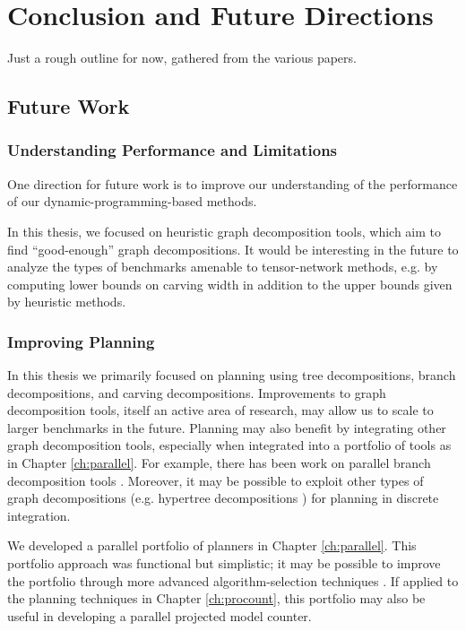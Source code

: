\chapter{Conclusion and Future Directions}
\label{ch:conclusion}
Just a rough outline for now, gathered from the various papers.

\section{Future Work}

\subsection{Understanding Performance and Limitations}
One direction for future work is to improve our understanding of the performance of our dynamic-programming-based methods.  

In this thesis, we focused on heuristic graph decomposition tools, which aim to find ``good-enough'' graph decompositions. It would be interesting in the future to analyze the types of benchmarks amenable to tensor-network methods, e.g. by computing lower bounds on carving width in addition to the upper bounds given by heuristic methods. 

\subsection{Improving Planning}
In this thesis we primarily focused on planning using tree decompositions, branch decompositions, and carving decompositions. 
Improvements to graph decomposition tools, itself an active area of research, may allow us to scale to larger benchmarks in the future.
Planning may also benefit by integrating other graph decomposition tools, especially when integrated into a portfolio of tools as in Chapter \ref{ch:parallel}. 
For example, there has been work on parallel branch decomposition tools \cite{hicks2000branch}.
Moreover, it may be possible to exploit other types of graph decompositions (e.g. hypertree decompositions \cite{AGG07}) for planning in discrete integration.

We developed a parallel portfolio of planners in Chapter \ref{ch:parallel}. 
This portfolio approach was functional but simplistic; it may be possible to improve the portfolio through more advanced algorithm-selection techniques \cite{HHLKS09,XHHL12}. 
If applied to the planning techniques in Chapter \ref{ch:procount}, this portfolio may also be useful in developing a parallel projected model counter.

